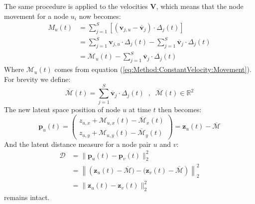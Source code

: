 The same procedure is applied to the velocities $\textbf{V}$, which means that the node movement for a node $u_i$ now becomes:
\begin{align}
    M_u(t) &= \sum_{j=1}^S \left[(\textbf{v}_{j,u} - \overline{\textbf{v}}_j) \cdot \Delta_{j}(t) \right] \\
    &= \sum_{j=1}^S \textbf{v}_{j, u} \cdot \Delta_{j}(t) - \sum_{j=1}^S \overline{\textbf{v}}_j \cdot \Delta_{j}(t) \\
    &= \mathcal{M}_u(t) - \sum_{j=1}^S \overline{\textbf{v}}_j \cdot \Delta_{j}(t)
\end{align}
Where $\mathcal{M}_u(t)$ comes from equation
(\ref{eq:Method:ConstantVelocity:Movement}).
\\
For brevity we define:
\begin{equation}
    \overline{\mathcal{M}}(t) = \sum_{j=1}^S \overline{\textbf{v}}_j \cdot \Delta_{j}(t) \;\;,\;\; \overline{\mathcal{M}}(t) \in \mathbb{R}^{2}
\end{equation}
The new latent space position of node $u$ at time $t$ then becomes:
\begin{equation}
    \textbf{p}_u(t) = 
     \begin{pmatrix}
        z_{u,x} + \mathcal{M}_{u,x}(t) - \overline{\mathcal{M}}_{x}(t) \\
        z_{u,y}+ \mathcal{M}_{u,y}(t) - \overline{\mathcal{M}}_{y}(t)
    \end{pmatrix} =
    \textbf{z}_u(t) - \overline{\mathcal{M}}
\end{equation}
And the latent distance measure for a node pair $u$ and $v$:
\begin{align}
     \mathcal{D} &= \rVert \textbf{p}_u(t) - \textbf{p}_v(t) \rVert_2^2 \\
     &= \left\rVert \left(\textbf{z}_u(t)-\overline{\mathcal{M}}) - (\textbf{z}_v(t)-\overline{\mathcal{M}}\right) \right\rVert_2^2 \\
     &= \rVert \textbf{z}_u(t) - \textbf{z}_v(t) \rVert_2^2 
\end{align}
remains intact.

